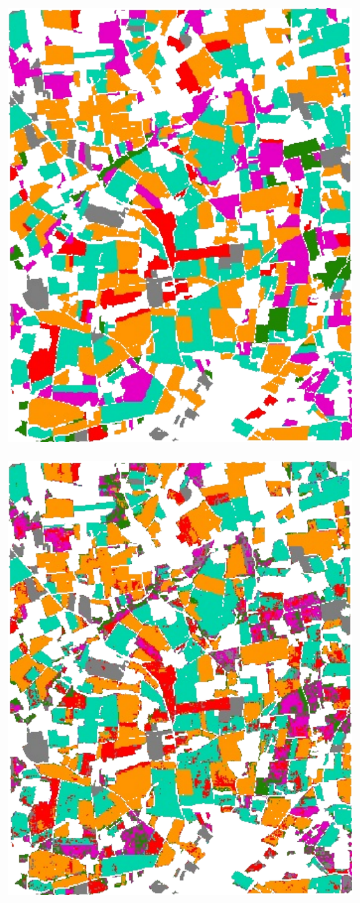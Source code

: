\documentclass[journal,article,submit,pdftex,moreauthors]{Definitions/mdpi}
\begin{document}
\begin{figure}[H]
	\centering
	\begin{subfigure}[t]{0.3\linewidth}
	\centering
	\includegraphics[height=\linewidth]{figures/aes_1_layer_mse_results/classification_maps/labels.pdf}
	\caption{}
	\label{fig:frh04_labels}
	\end{subfigure}\hspace{-1.5mm}
	\begin{subfigure}[t]{0.3\linewidth}
	  \includegraphics[height=\linewidth]{figures/aes_1_layer_mse_results/classification_maps/prediction_pixel_level.pdf}

\end{subfigure}
\end{figure}
\end{document}
